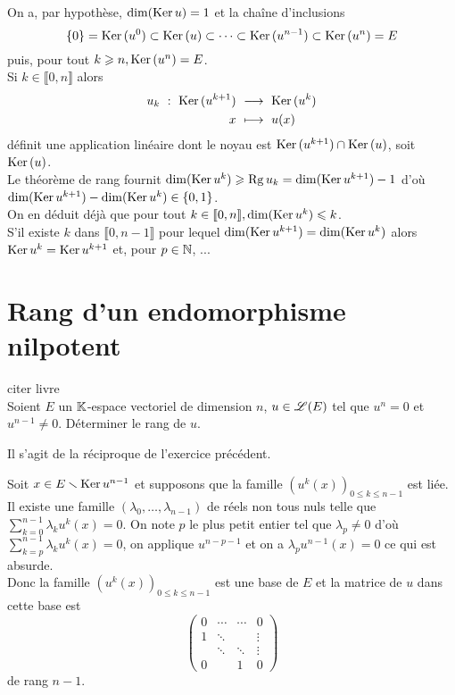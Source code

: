 \begin{solution}
    On a, par hypothèse, $\dim(\mathrm{Ker}\, u) = 1$ et la chaîne d'inclusions
    $$\{0\} = \mathrm{Ker}\,(u^0) \subset \mathrm{Ker}\,(u) \subset \cdots \subset \mathrm{Ker}\,(u^{n-1}) \subset \mathrm{Ker}\,(u^n) = E$$
    puis, pour tout $k \geqslant n, \mathrm{Ker}\,(u^n) = E$. \\
    Si $k \in \llbracket 0, n \rrbracket$ alors 
    \begin{alignat*}{2}
        u_k\ :\ \mathrm{Ker}\,(u^{k+1})\ &\longrightarrow\ \mathrm{Ker}\,(u^k)\\
        x\ &\longmapsto\ u(x)
    \end{alignat*}
    définit une application linéaire dont le noyau est $\mathrm{Ker}\,(u^{k+1}) \cap \mathrm{Ker}\,(u)$, soit $\mathrm{Ker}\,(u)$. \\
    Le théorème de rang fournit $\dim(\mathrm{Ker}\, u^k) \geqslant \mathrm{Rg}\, u_k = \dim( \mathrm{Ker}\, u^{k+1}) - 1$ d'où $\dim(\mathrm{Ker}\, u^{k+1}) - \dim(\mathrm{Ker}\, u^k) \in \{ 0, 1 \}$. \\
    On en déduit déjà que pour tout $k \in \llbracket 0, n \rrbracket, \dim(\mathrm{Ker}\, u^k) \leqslant k$. \\
    S'il existe $k$ dans $\llbracket 0, n-1 \rrbracket$ pour lequel $\dim( \mathrm{Ker}\, u^{k+1}) = \dim(\mathrm{Ker}\, u^k)$ alors $\mathrm{Ker}\, u^k = \mathrm{Ker}\, u^{k+1}$ et, pour $p \in \mathbb{N}$, 
    ...
\end{solution}

\section{Rang d'un endomorphisme nilpotent} 
\begin{exercice}
    citer livre \\
    Soient $E$ un $\mathbb{K}$-espace vectoriel de dimension $n$, $u \in \mathscr{L}(E)$ tel que $u^n = 0$ et $u^{n-1} \not= 0$. Déterminer le rang de $u$.
\end{exercice}

Il s'agit de la réciproque de l'exercice précédent.

\begin{solution}
    Soit $x \in E \smallsetminus \mathrm{Ker}\, u^{n-1}$ et supposons que la famille $\left( u^k(x)\right)_{0 \leqslant k \leqslant n-1}$ est liée. Il existe une famille $(\lambda_0, \dots, \lambda_{n-1})$ de réels non tous nuls telle que $\sum\limits_{k=0}^{n-1} \lambda_k u^k(x) = 0$. On note $p$ le plus petit entier tel que $\lambda_p \not= 0$ d'où $\sum\limits_{k=p}^{n-1} \lambda_k u^k(x) = 0$, on applique $u^{n-p-1}$ et on a $\lambda_p u^{n-1}(x) = 0$ ce qui est absurde. \\
    Donc la famille $\left( u^k(x)\right)_{0 \leqslant k \leqslant n-1}$ est une base de $E$ et la matrice de $u$ dans cette base est 
    $$
    \begin{pmatrix}
        0 & \cdots & \cdots & 0 \\
        1 & \ddots & & \vdots \\
        & \ddots & \ddots & \vdots \\
        0 & & 1 & 0
    \end{pmatrix}
    $$
    de rang $n-1$.
\end{solution}